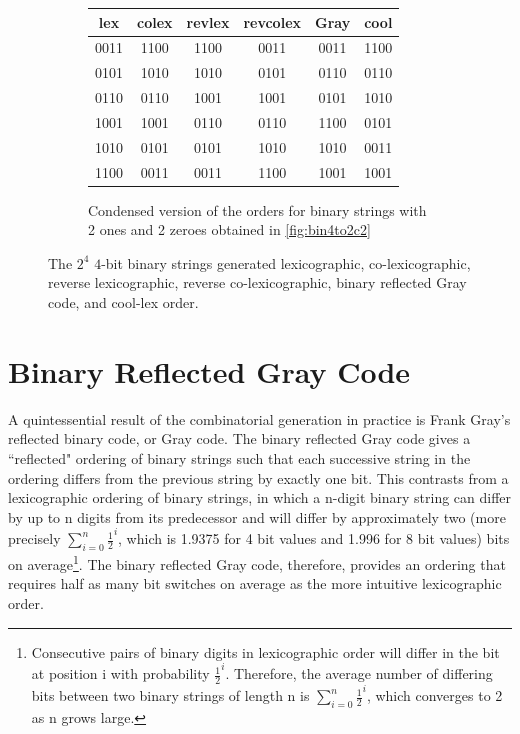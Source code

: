 \begin{figure}[]
\begin{subfigure}[]{\textwidth}
\begin{center}
\begin{tabular}{ |c|c|c|c||c||c| }
                 \hline
                 lex  & colex & revlex & revcolex & Gray & cool\\
                 \hline
                 0011 & 1100 & 1100 & 0011 & 0011 & 1100 \\
                 0101 & 1010 & 1010 & 0101 & 0110 & 0110 \\
                 0110 & 0110 & 1001 & 1001 & 0101 & 1010 \\
                 1001 & 1001 & 0110 & 0110 & 1100 & 0101 \\
                 1010 & 0101 & 0101 & 1010 & 1010 & 0011 \\
                 1100 & 0011 & 0011 & 1100 & 1001 & 1001 \\
                 \hline
             \end{tabular}

         \end{center}
         \caption{Condensed version of the orders for binary strings with 2 ones and 2 zeroes obtained in \ref{fig:bin4to2c2}}
         \label{fig:2c2}
     \end{subfigure}
     \begin{center}

     \end{center}
     \caption{The $2^4$ $4$-bit binary strings generated lexicographic, co-lexicographic, reverse lexicographic, reverse co-lexicographic, binary reflected Gray code, and cool-lex order.}
     \label{fig:bintable}
 \end{figure}


\section{Binary Reflected Gray Code} \label{sec:BRGC}

A quintessential result of the combinatorial generation in practice is Frank Gray's reflected binary code, or Gray code. The binary reflected Gray code gives a ``reflected" ordering of binary strings such that each successive string in the ordering differs from the previous string by exactly one bit. This contrasts from a lexicographic ordering of binary strings, in which a n-digit binary string can differ by up to n digits from its predecessor and will differ by approximately two (more precisely $\sum_{i=0}^n\frac{1}{2}^i$, which is 1.9375 for 4 bit values and 1.996 for 8 bit values) bits on average\footnote{Consecutive pairs of binary digits in lexicographic order will differ in the bit at position i with probability $\frac{1}{2}^i$.  Therefore, the average number of differing bits between two binary strings of length n is $\sum_{i=0}^n\frac{1}{2}^i$, which converges to 2 as n grows large.}. The binary reflected Gray code, therefore, provides an ordering that requires half as many bit switches on average as the more intuitive lexicographic order. 

